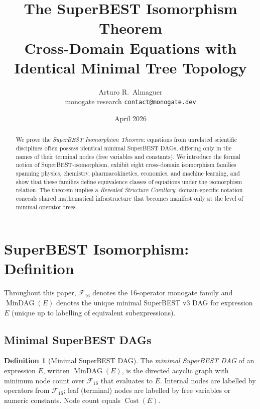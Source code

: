 \documentclass[12pt,a4paper]{article}
\title{The SuperBEST Isomorphism Theorem\\[6pt]
       \large Cross-Domain Equations with Identical Minimal Tree Topology}
\author{Arturo R.\ Almaguer\\
\small monogate research \quad \texttt{contact@monogate.dev}}
\date{April 2026}
\theoremstyle{definition}
\newtheorem{definition}[theorem]{Definition}
\newcommand{\Cost}{\operatorname{Cost}}
\newcommand{\MinDAG}{\operatorname{MinDAG}}
\begin{document}
\maketitle

\begin{abstract}
We prove the \emph{SuperBEST Isomorphism Theorem}: equations from unrelated
scientific disciplines often possess identical minimal SuperBEST DAGs, differing
only in the names of their terminal nodes (free variables and constants).
We introduce the formal notion of SuperBEST-isomorphism, exhibit eight
cross-domain isomorphism families spanning physics, chemistry, pharmacokinetics,
economics, and machine learning, and show that these families define equivalence
classes of equations under the isomorphism relation.  The theorem implies a
\emph{Revealed Structure Corollary}: domain-specific notation conceals shared
mathematical infrastructure that becomes manifest only at the level of minimal
operator trees.
\end{abstract}

\tableofcontents
\bigskip

\section{SuperBEST Isomorphism: Definition}
\label{sec:def}

Throughout this paper, $\mathcal{F}_{16}$ denotes the 16-operator monogate
family and $\MinDAG(E)$ denotes the unique minimal SuperBEST v3 DAG for
expression $E$ (unique up to labelling of equivalent subexpressions).

\subsection{Minimal SuperBEST DAGs}

\begin{definition}[Minimal SuperBEST DAG]
\label{def:mindag}
The \emph{minimal SuperBEST DAG} of an expression $E$, written $\MinDAG(E)$,
is the directed acyclic graph with minimum node count over $\mathcal{F}_{16}$
that evaluates to $E$.  Internal nodes are labelled by operators from
$\mathcal{F}_{16}$; leaf (terminal) nodes are labelled by free variables or
numeric constants.  Node count equals $\Cost(E)$.
\end{definition}
\end{document}

